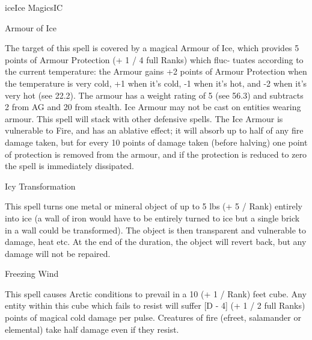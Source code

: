 \begin{College}[1.5]{ice}{Ice Magics}{IC}
\begin{spell}[S-1]{Armour of Ice}
\begin{effects}
The target of this spell is covered by a magical Armour of Ice, which
provides 5 points of Armour Protection (+ 1 / 4 full Ranks) which
fluc- tuates according to the current temperature: the Armour gains +2
points of Armour Protection when the temperature is very cold, +1 when
it’s cold, -1 when it’s hot, and -2 when it’s very hot (see 22.2). The
armour has a weight rating of 5 (see 56.3) and subtracts 2 from AG and
20 from stealth.  Ice Armour may not be cast on entities wearing
armour.  This spell will stack with other defensive spells.  The Ice
Armour is vulnerable to Fire, and has an ablative effect; it will
absorb up to half of any fire damage taken, but for every 10 points of
damage taken (before halving) one point of protection is removed from
the armour, and if the protection is reduced to zero the spell is
immediately dissipated.
\end{effects}
\end{spell}

\begin{spell}[S-2]{Icy Transformation}
\begin{effects}
This spell turns one metal or mineral object of up to 5 lbs (+ 5 /
Rank) entirely into ice (a wall of iron would have to be entirely
turned to ice but a single brick in a wall could be transformed).  The
object is then transparent and vulnerable to damage, heat etc.  At the
end of the duration, the object will revert back, but any damage will
not be repaired.
\end{effects}
\end{spell}

\begin{spell}[S-3]{Freezing Wind}
\begin{effects}
This spell causes Arctic conditions to prevail in a 10 (+ 1 / Rank)
feet cube.  Any entity within this cube which fails to resist will
suffer [D - 4] (+ 1 / 2 full Ranks) points of magical cold damage per
pulse.  Creatures of fire (efreet, salamander or elemental) take half
damage even if they resist.
\end{effects}
\end{spell}


\end{College}
